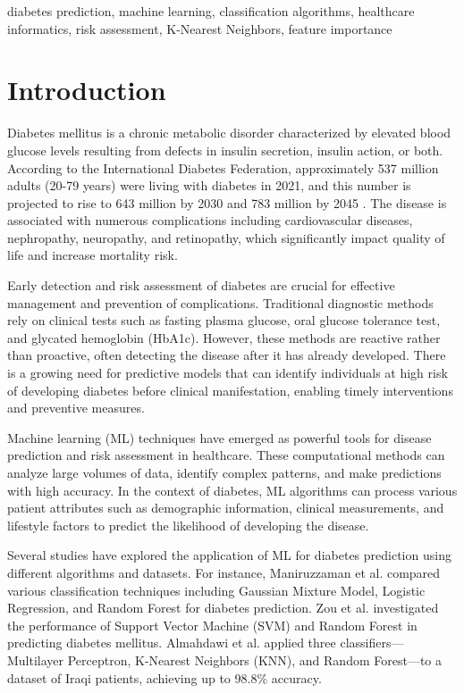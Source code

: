 \documentclass[conference]{IEEEtran}
\begin{document}
\begin{IEEEkeywords}
diabetes prediction, machine learning, classification algorithms, healthcare informatics, risk assessment, K-Nearest Neighbors, feature importance
\end{IEEEkeywords}

\section{Introduction}
Diabetes mellitus is a chronic metabolic disorder characterized by elevated blood glucose levels resulting from defects in insulin secretion, insulin action, or both. According to the International Diabetes Federation, approximately 537 million adults (20-79 years) were living with diabetes in 2021, and this number is projected to rise to 643 million by 2030 and 783 million by 2045 \cite{idf2021}. The disease is associated with numerous complications including cardiovascular diseases, nephropathy, neuropathy, and retinopathy, which significantly impact quality of life and increase mortality risk.

Early detection and risk assessment of diabetes are crucial for effective management and prevention of complications. Traditional diagnostic methods rely on clinical tests such as fasting plasma glucose, oral glucose tolerance test, and glycated hemoglobin (HbA1c). However, these methods are reactive rather than proactive, often detecting the disease after it has already developed. There is a growing need for predictive models that can identify individuals at high risk of developing diabetes before clinical manifestation, enabling timely interventions and preventive measures.

Machine learning (ML) techniques have emerged as powerful tools for disease prediction and risk assessment in healthcare. These computational methods can analyze large volumes of data, identify complex patterns, and make predictions with high accuracy. In the context of diabetes, ML algorithms can process various patient attributes such as demographic information, clinical measurements, and lifestyle factors to predict the likelihood of developing the disease.

Several studies have explored the application of ML for diabetes prediction using different algorithms and datasets. For instance, Maniruzzaman et al. \cite{maniruzzaman2017} compared various classification techniques including Gaussian Mixture Model, Logistic Regression, and Random Forest for diabetes prediction. Zou et al. \cite{zou2018} investigated the performance of Support Vector Machine (SVM) and Random Forest in predicting diabetes mellitus. Almahdawi et al. \cite{almahdawi2023} applied three classifiers—Multilayer Perceptron, K-Nearest Neighbors (KNN), and Random Forest—to a dataset of Iraqi patients, achieving up to 98.8\% accuracy.
\end{document}
